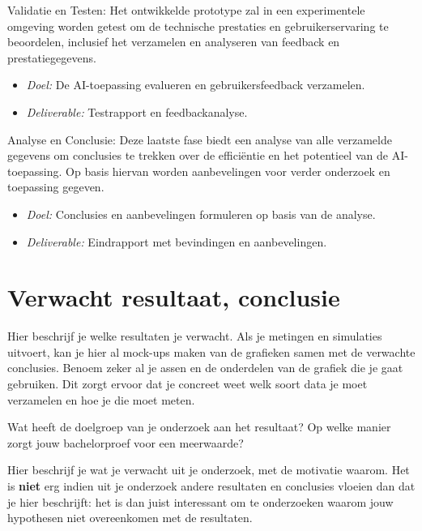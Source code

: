 Validatie en Testen:
Het ontwikkelde prototype zal in een experimentele omgeving worden getest om de technische prestaties en gebruikerservaring te beoordelen, inclusief het verzamelen en analyseren van feedback en prestatiegegevens.
\begin{itemize}
    \item \textit{Doel:} De AI-toepassing evalueren en gebruikersfeedback verzamelen.
    \item \textit{Deliverable:} Testrapport en feedbackanalyse.
\end{itemize}

Analyse en Conclusie:
Deze laatste fase biedt een analyse van alle verzamelde gegevens om conclusies te trekken over de efficiëntie en het potentieel van de AI-toepassing. Op basis hiervan worden aanbevelingen voor verder onderzoek en toepassing gegeven.
\begin{itemize}
    \item \textit{Doel:} Conclusies en aanbevelingen formuleren op basis van de analyse.
    \item \textit{Deliverable:} Eindrapport met bevindingen en aanbevelingen.
\end{itemize}

\section{Verwacht resultaat, conclusie}%
\label{sec:verwachte_resultaten}

Hier beschrijf je welke resultaten je verwacht. Als je metingen en simulaties uitvoert, kan je hier al mock-ups maken van de grafieken samen met de verwachte conclusies. Benoem zeker al je assen en de onderdelen van de grafiek die je gaat gebruiken. Dit zorgt ervoor dat je concreet weet welk soort data je moet verzamelen en hoe je die moet meten.

Wat heeft de doelgroep van je onderzoek aan het resultaat? Op welke manier zorgt jouw bachelorproef voor een meerwaarde?

Hier beschrijf je wat je verwacht uit je onderzoek, met de motivatie waarom. Het is \textbf{niet} erg indien uit je onderzoek andere resultaten en conclusies vloeien dan dat je hier beschrijft: het is dan juist interessant om te onderzoeken waarom jouw hypothesen niet overeenkomen met de resultaten.

